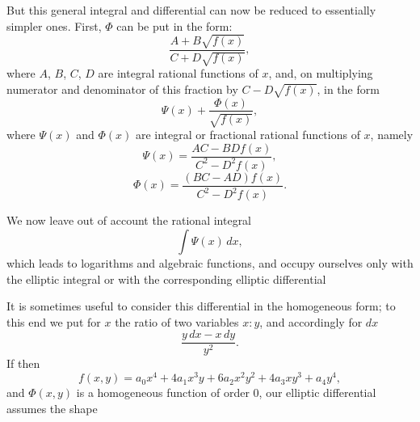  But this general integral and differential can now be reduced to essentially simpler ones. First, $\Phi$ can be put in the form:
\[
\frac{A + B\sqrt{f(x)}}{C + D\sqrt{f(x)}},
\]
where $A$, $B$, $C$, $D$ are integral rational functions of $x$, and, on multiplying numerator and denominator of this fraction by $C - D\sqrt{f(x)}$, in the form
\[
\Psi(x) + \frac{\Phi(x)}{\sqrt{f(x)}},
\]
where $\Psi(x)$ and $\Phi(x)$ are integral or fractional rational functions of $x$, namely
\[
\Psi(x) = \frac{AC - BDf(x)}{C^2 - D^2f(x)},
\]
\[
\Phi(x) = \frac{(BC - AD)f(x)}{C^2 - D^2f(x)}.
\]

We now leave out of account the rational integral
\[
\int \Psi(x)\, dx,
\]
which leads to logarithms and algebraic functions, and occupy ourselves only with the elliptic integral
or with the corresponding elliptic differential

It is sometimes useful to consider this differential in the homogeneous form; to this end we put for $x$ the ratio of two variables $x:y$, and accordingly for $dx$
\[
\frac{y\, dx - x\, dy}{y^2}.
\]
If then
\[
f(x, y) = a_0 x^4 + 4 a_1 x^3 y + 6 a_2 x^2 y^2 + 4 a_3 x y^3 + a_4 y^4,
\]
and $\Phi(x, y)$ is a homogeneous function of order 0, our elliptic differential assumes the shape
